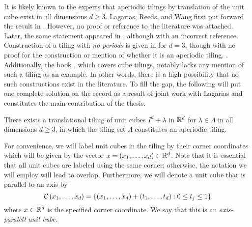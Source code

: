 \documentclass[../thesis.tex]{subfiles}
\begin{document}

It is likely known to the experts that aperiodic tilings by translation of the unit cube exist in all dimensions $d\geq3$. Lagarias, Reeds, and Wang first put forward the result in \cite{lagariasOrthonormalBasesExponentials2000}. However, no proof or reference to the literature was attached. Later, the same statement appeared in \cite{liuUniformityNonUniformGabor2003}, although with an incorrect reference. Construction of a tiling with \emph{no periods} is given in \cite{kolountzakisStudyTranslationalTiling2003} for $d=3$, though with no proof for the construction or mention of whether it is an aperiodic tiling. . Additionally, the book \cite{zongCubeWindowConvex2006}, which covers cube tilings, notably lacks any mention of such a tiling as an example. In other words, there is a high possibility that no such constructions exist in the literature. To fill the gap, the following will put one complete solution on the record as a result of joint work with Lagarias \cite{haugeAperiodicTilingTranslations2023} and constitutes the main contribution of the thesis. 

\begin{theorem}
    There exists a translational tiling of unit cubes $I^d + \lambda$ in $\mathbb{R}^d$ for $\lambda\in \Lambda$ in all dimensions $d\geq3$, in which the tiling set $\Lambda$ constitutes an aperiodic tiling.
\end{theorem}

For convenience, we will label unit cubes in the tiling by their corner coordinates which will be given by the vector $x = (x_1,\dots,x_d) \in \mathbb{R}^d$. Note that it is essential that all unit cubes are labeled using the same corner; otherwise, the notation we will employ will lead to overlap. Furthermore, we will denote a unit cube that is parallel to an axis by
\begin{equation*}
    \mathcal{C}\left(x_1,\dots,x_d\right) = \left\{(x_1,\dots,x_d) + (t_1,\dots,t_d) : 0 \leq t_j \leq 1\right\}
\end{equation*} 
where $x\in \mathbb{R}^d$ is the specified corner coordinate. We say that this is an \emph{axis-paralell unit cube}. 
\end{document}
